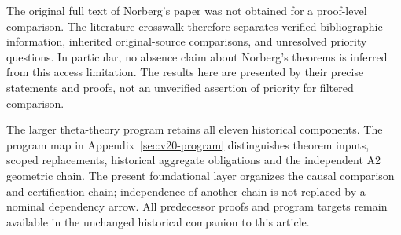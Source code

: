 The original full text of Norberg's paper was not obtained for a
proof-level comparison. The literature crosswalk therefore separates
verified bibliographic information, inherited original-source comparisons,
and unresolved priority questions. In particular, no absence claim about
Norberg's theorems is inferred from this access limitation. The results
here are presented by their precise statements and proofs, not an
unverified assertion of priority for filtered comparison.

The larger theta-theory program retains all eleven historical components.
The program map in Appendix~\ref{sec:v20-program} distinguishes theorem
inputs, scoped replacements, historical aggregate obligations and the
independent A2 geometric chain. The present foundational layer organizes
the causal comparison and certification chain; independence of another
chain is not replaced by a nominal dependency arrow. All predecessor
proofs and program targets remain available in the unchanged historical
companion to this article.
